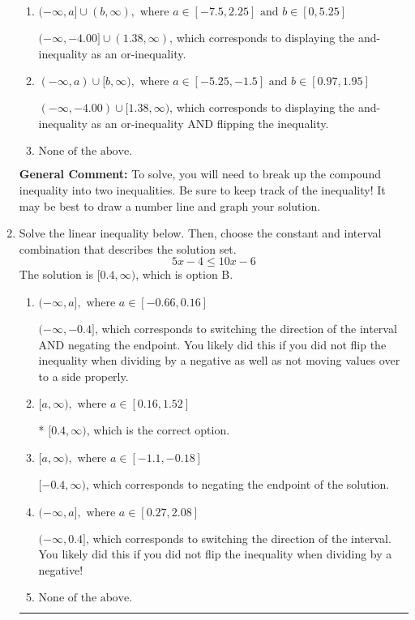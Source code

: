 \documentclass{extbook}[14pt]
\newcommand{\litem}[1]{\item #1

\rule{\textwidth}{0.4pt}}
\begin{document}
\begin{enumerate}
{\begin{enumerate}[label=\Alph*.]
$(-4.00, 1.38]$, which corresponds to flipping the inequality.
\item \( (-\infty, a] \cup (b, \infty), \text{ where } a \in [-7.5, 2.25] \text{ and } b \in [0, 5.25] \)

$(-\infty, -4.00] \cup (1.38, \infty)$, which corresponds to displaying the and-inequality as an or-inequality.
\item \( (-\infty, a) \cup [b, \infty), \text{ where } a \in [-5.25, -1.5] \text{ and } b \in [0.97, 1.95] \)

$(-\infty, -4.00) \cup [1.38, \infty)$, which corresponds to displaying the and-inequality as an or-inequality AND flipping the inequality.
\item \( \text{None of the above.} \)


\end{enumerate}

\textbf{General Comment:} To solve, you will need to break up the compound inequality into two inequalities. Be sure to keep track of the inequality! It may be best to draw a number line and graph your solution.
}
\litem{
Solve the linear inequality below. Then, choose the constant and interval combination that describes the solution set.
\[ 5x -4 \leq 10x -6 \]The solution is \( [0.4, \infty) \), which is option B.\begin{enumerate}[label=\Alph*.]
\item \( (-\infty, a], \text{ where } a \in [-0.66, 0.16] \)

 $(-\infty, -0.4]$, which corresponds to switching the direction of the interval AND negating the endpoint. You likely did this if you did not flip the inequality when dividing by a negative as well as not moving values over to a side properly.
\item \( [a, \infty), \text{ where } a \in [0.16, 1.52] \)

* $[0.4, \infty)$, which is the correct option.
\item \( [a, \infty), \text{ where } a \in [-1.1, -0.18] \)

 $[-0.4, \infty)$, which corresponds to negating the endpoint of the solution.
\item \( (-\infty, a], \text{ where } a \in [0.27, 2.08] \)

 $(-\infty, 0.4]$, which corresponds to switching the direction of the interval. You likely did this if you did not flip the inequality when dividing by a negative!
\item \( \text{None of the above}. \)


\end{enumerate}}
\end{enumerate}
\end{document}
